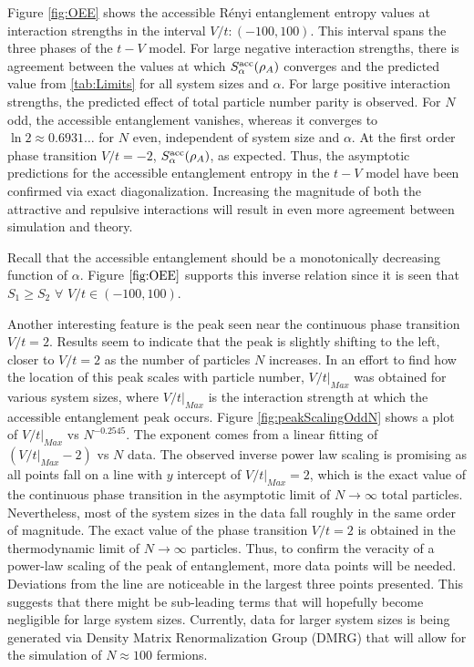 Figure \ref{fig:OEE} shows the accessible R\'enyi entanglement entropy values at interaction strengths in the interval $V/t: \left( -100,100 \right)$. This interval spans the three phases of the $t-V$ model. For large negative interaction strengths, there is agreement between the values at which $S_{\alpha}^{\rm acc}(\rho_A)$ converges and the predicted value from \ref{tab:Limits} for all system sizes and $\alpha$. For large positive interaction strengths, the predicted effect of total particle number parity is observed. For $N$ odd, the accessible entanglement vanishes, whereas it converges to $\ln{2} \approx 0.6931 \dots$ for $N$ even, independent of system size and $\alpha$. At the first order phase transition $V/t=-2$, $S_{\alpha}^{\rm acc}(\rho_A)$, as expected. Thus, the asymptotic predictions for the accessible entanglement entropy in the $t-V$ model have been confirmed via exact diagonalization. Increasing the magnitude of both the attractive and repulsive interactions will result in even more agreement between simulation and theory.

Recall that the accessible entanglement should be a monotonically decreasing function of $\alpha$. Figure $\ref{fig:OEE}$ supports this inverse relation since it is seen that $S_{1} \geq S_{2}$ $\forall$ $V/t \in \left( -100,100 \right)$.

Another interesting feature is the peak seen near the continuous phase transition $V/t=2$. Results seem to indicate that the peak is slightly shifting to the left, closer to $V/t=2$ as the number of particles $N$ increases. In an effort to find how the location of this peak scales with particle number, $V/t\vert_{Max}$ was obtained for various system sizes, where $V/t\vert_{Max}$ is the interaction strength at which the accessible entanglement peak occurs. Figure \ref{fig:peakScalingOddN} shows a plot of $V/t\vert_{Max}$ vs $N^{-0.2545}$. The exponent comes from a linear fitting of $\left( V/t\vert_{Max} - 2 \right)$ vs $N$ data. The observed inverse power law scaling is promising as all points fall on a line with $y$ intercept of $V/t\vert_{Max} = 2$, which is the exact value of the continuous phase transition in the asymptotic limit of $N \to \infty$ total particles. Nevertheless, most of the system sizes in the data fall roughly in the same order of magnitude. The exact value of the phase transition $V/t = 2$ is obtained in the thermodynamic limit of $N\to\infty$ particles. Thus, to confirm the veracity of a power-law scaling of the peak of entanglement, more data points will be needed. Deviations from the line are noticeable in the largest three points presented. This suggests that there might be sub-leading terms that will hopefully become negligible for large system sizes. Currently, data for larger system sizes is being generated via Density Matrix Renormalization Group (DMRG) that will allow for the simulation of $N\approx100$ fermions.


